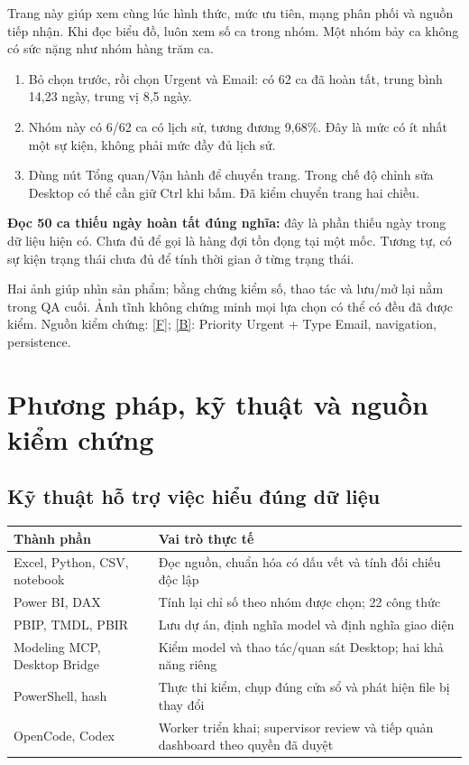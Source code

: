 \documentclass[11pt,a4paper]{article}
\newcommand{\lead}[1]{\begingroup\setlength{\fboxsep}{10pt}\colorbox{mist}{\parbox{\dimexpr\linewidth-20pt\relax}{\color{navy}#1}}\endgroup\par}
\newcommand{\evidence}[1]{{\small\color{muted}Nguồn kiểm chứng: #1.}\par}
\newcommand{\src}[2]{\hyperlink{source-index}{[#2]}}
\begin{document}
Trang này giúp xem cùng lúc hình thức, mức ưu tiên, mạng phân phối và nguồn tiếp nhận. Khi đọc biểu đồ, luôn xem số ca trong nhóm. Một nhóm bảy ca không có sức nặng như nhóm hàng trăm ca.

\begin{enumerate}
\item Bỏ chọn trước, rồi chọn Urgent và Email: có 62 ca đã hoàn tất, trung bình 14,23 ngày, trung vị 8,5 ngày.
\item Nhóm này có 6/62 ca có lịch sử, tương đương 9,68\%. Đây là mức có ít nhất một sự kiện, không phải mức đầy đủ lịch sử.
\item Dùng nút Tổng quan/Vận hành để chuyển trang. Trong chế độ chỉnh sửa Desktop có thể cần giữ Ctrl khi bấm. Đã kiểm chuyển trang hai chiều.
\end{enumerate}

\lead{\textbf{Đọc 50 ca thiếu ngày hoàn tất đúng nghĩa:} đây là phần thiếu ngày trong dữ liệu hiện có. Chưa đủ để gọi là hàng đợi tồn đọng tại một mốc. Tương tự, có sự kiện trạng thái chưa đủ để tính thời gian ở từng trạng thái.}

Hai ảnh giúp nhìn sản phẩm; bằng chứng kiểm số, thao tác và lưu/mở lại nằm trong QA cuối. Ảnh tĩnh không chứng minh mọi lựa chọn có thể có đều đã được kiểm.
\evidence{\src{source-images}{F}; \src{source-qa}{B}: Priority Urgent + Type Email, navigation, persistence}
\clearpage

\section{Phương pháp, kỹ thuật và nguồn kiểm chứng}
\subsection*{Kỹ thuật hỗ trợ việc hiểu đúng dữ liệu}
{\small
\begin{tabularx}{\linewidth}{@{}L{4.5cm}Y@{}}
\toprule
\textbf{Thành phần} & \textbf{Vai trò thực tế}\\
\midrule
Excel, Python, CSV, notebook & Đọc nguồn, chuẩn hóa có dấu vết và tính đối chiếu độc lập\\
Power BI, DAX & Tính lại chỉ số theo nhóm được chọn; 22 công thức\\
PBIP, TMDL, PBIR & Lưu dự án, định nghĩa model và định nghĩa giao diện\\
Modeling MCP, Desktop Bridge & Kiểm model và thao tác/quan sát Desktop; hai khả năng riêng\\
PowerShell, hash & Thực thi kiểm, chụp đúng cửa sổ và phát hiện file bị thay đổi\\
OpenCode, Codex & Worker triển khai; supervisor review và tiếp quản dashboard theo quyền đã duyệt\\
\bottomrule
\end{tabularx}}
\end{document}
